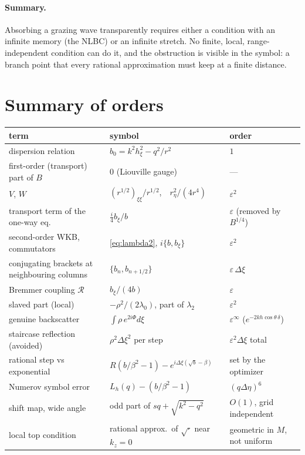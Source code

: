 \documentclass[11pt]{article}
\begin{document}
\paragraph{Summary.} Absorbing a grazing wave transparently requires either a
condition with an infinite memory (the NLBC) or an infinite stretch. No
finite, local, range-independent condition can do it, and the obstruction is
visible in the symbol: a branch point that every rational approximation must
keep at a finite distance.

\section{Summary of orders}\label{sec:orders}

\begin{center}
\footnotesize
\begin{tabular}{@{}lll@{}}
\toprule
term & symbol & order \\
\midrule
dispersion relation & $b_0=k^2h_\xi^2-q^2/r^2$ & $1$ \\
first-order (transport) part of $B$ & $0$ (Liouville gauge) & --- \\
$V$, $W$ & $(r^{1/2})_{\xi\xi}/r^{1/2}$,\ \ $r_\eta^2/(4r^4)$ & $\varepsilon^2$ \\
transport term of the one-way eq. & $\tfrac i4 b_\xi/b$ & $\varepsilon$ (removed by $B^{1/4}$) \\
second-order WKB, commutators & \eqref{eq:lambda2}, $i\{b,b_\xi\}$ & $\varepsilon^2$ \\
conjugating brackets at neighbouring columns & $\{b_n,b_{n+1/2}\}$ & $\varepsilon\,\Delta\xi$ \\
Bremmer coupling $\mathcal R$ & $b_\xi/(4b)$ & $\varepsilon$ \\
\quad slaved part (local) & $-\rho^2/(2\lambda_0)$, part of $\lambda_2$ & $\varepsilon^2$ \\
\quad genuine backscatter & $\int\rho\,e^{2i\Phi}d\xi$ & $\varepsilon^\infty$ ($e^{-2kh\cos\theta\,\delta}$) \\
staircase reflection (avoided) & $\rho^2\Delta\xi^2$ per step & $\varepsilon^2\Delta\xi$ total \\
rational step vs exponential & $R(b/\beta^2-1)-e^{i\Delta\xi(\sqrt b-\beta)}$ & set by the optimizer \\
Numerov symbol error & $L_h(q)-(b/\beta^2-1)$ & $(q\Delta\eta)^6$ \\
shift map, wide angle & odd part of $sq+\sqrt{k^2-q^2}$ & $O(1)$, grid independent \\
local top condition & rational approx.\ of $\sqrt{\cdot}$ near $k_z=0$ & geometric in $M$, not uniform \\
\bottomrule
\end{tabular}
\end{center}
\end{document}
